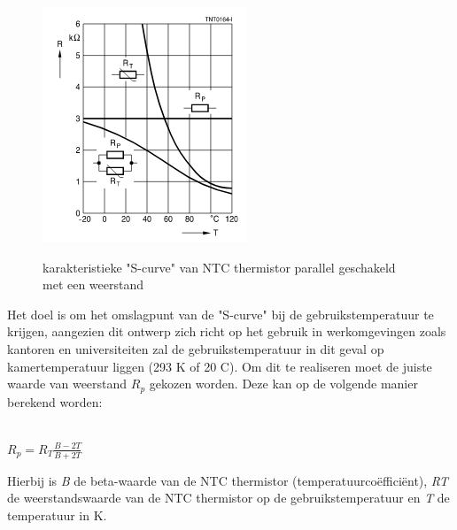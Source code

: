\documentclass[a4paper, 11pt]{article} %
\begin{document}
	\begin{figure}[h!]
		\centering
		\hspace*{-1cm} 
		\includegraphics[width=0.7\linewidth]{../Media/lineairNTC.png}
		\caption{karakteristieke "S-curve" van NTC thermistor parallel geschakeld met een weerstand \cite{TDK}} \cite{thermistorCurve}
		\label{fig::s_curve}
	\end{figure}
	Het doel is om het omslagpunt van de "S-curve" bij de gebruikstemperatuur te krijgen, aangezien dit ontwerp zich richt op het gebruik in werkomgevingen zoals kantoren en universiteiten zal de gebruikstemperatuur in dit geval op kamertemperatuur liggen (293 \degree K of 20 \degree C). Om dit te realiseren moet de juiste waarde van weerstand \begin{math} R_p \end{math} gekozen worden. Deze kan op de volgende manier berekend worden:\\
	\begin{center}
		\cite{TDK} \\
		\Large
		\begin{math}
		R_p = R_T \frac{B-2T}{B+2T}
		\end{math}
	\end{center}
	Hierbij is \textit{B} de beta-waarde van de NTC thermistor (temperatuurcoëfficiënt), \textit{R{\small T}} de weerstandswaarde van de NTC thermistor op de gebruikstemperatuur en \textit{T} de temperatuur in \degree K.
	\newpage
\end{document}

